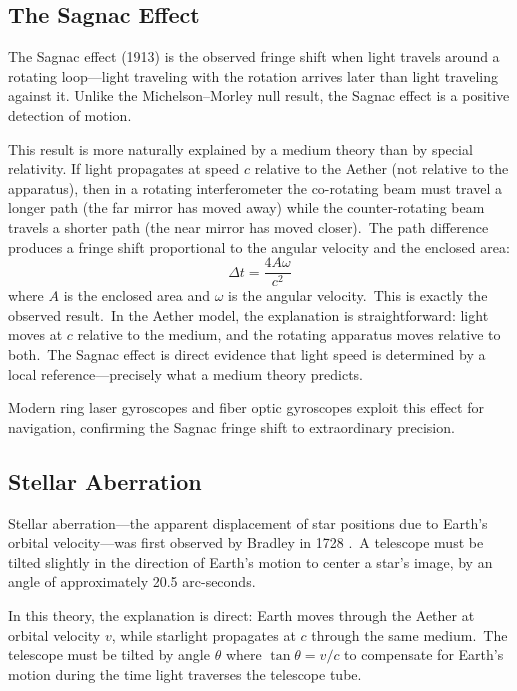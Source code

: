 ﻿\documentclass[12pt,letterpaper]{article}
\begin{document}
\subsection{The Sagnac Effect}

The Sagnac effect \cite{sagnac1913} (1913) is the observed fringe shift when light travels around a rotating
loop---light traveling with the rotation arrives later than light traveling against it.
Unlike the Michelson--Morley null result, the Sagnac effect is a positive detection of
motion.

This result is more naturally explained by a medium theory than by special relativity.
If light propagates at speed $c$ relative to the Aether (not relative to the apparatus),
then in a rotating interferometer the co-rotating beam must travel a longer path (the
far mirror has moved away) while the counter-rotating beam travels a shorter path (the
near mirror has moved closer).\ The path difference produces a fringe shift proportional
to the angular velocity and the enclosed area:
%
\begin{equation}
  \Delta t = \frac{4A\omega}{c^2}
\end{equation}
%
where $A$ is the enclosed area and $\omega$ is the angular velocity.\ This is exactly the
observed result.\ In the Aether model, the explanation is straightforward: light moves at $c$
relative to the medium, and the rotating apparatus moves relative to both.\ The Sagnac
effect is direct evidence that light speed is determined by a local reference---precisely
what a medium theory predicts.

Modern ring laser gyroscopes and fiber optic gyroscopes exploit this effect for navigation,
confirming the Sagnac fringe shift to extraordinary precision.


\subsection{Stellar Aberration}

Stellar aberration---the apparent displacement of star positions due to Earth's orbital
velocity---was first observed by Bradley in 1728 \cite{bradley1728}.\ A telescope must be tilted slightly in
the direction of Earth's motion to center a star's image, by an angle of approximately
20.5 arc-seconds.

In this theory, the explanation is direct: Earth moves through the Aether at orbital
velocity $v$, while starlight propagates at $c$ through the same medium.\ The telescope must
be tilted by angle $\theta$ where $\tan\theta = v/c$ to compensate for Earth's motion during
the time light traverses the telescope tube.
\end{document}
